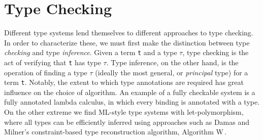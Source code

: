 \section{Type Checking}
\label{sec:type-checking}





Different type systems lend themselves to different approaches to type checking. In order to characterize these, we must first make the distinction between type \emph{checking} and type \emph{inference}. Given a term \texttt{t} and a type $\tau$, type checking is the act of verifying that \texttt{t} has type $\tau$. Type inference, on the other hand, is the operation of finding a type $\tau$ (ideally the most general, or \emph{principal} type) for a term \texttt{t}. Notably, the extent to which type annotations are required has great influence on the choice of algorithm. An example of a fully checkable system is a fully annotated lambda calculus, in which every binding is annotated with a type. On the other extreme we find ML-style type systems with let-polymorphism, where all types can be efficiently inferred using approaches such as Damas and Milner's constraint-based type reconstruction algorithm, Algorithm W\,\cite{Damas:1982}. 

